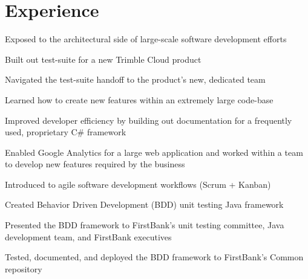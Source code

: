 \documentclass[]{darling-resume-openfont}
\begin{document}
\hfill
\begin{minipage}[t]{0.66\textwidth} 


\section{Experience}
\vspace{\topsep} %
\begin{tightemize}
\item Exposed to the architectural side of large-scale software development efforts
\item Built out test-suite for a new Trimble Cloud product
\item Navigated the test-suite handoff to the product's new, dedicated team
\end{tightemize}
\sectionsep

\begin{tightemize}
\item Learned how to create new features within an extremely large code-base
\item Improved developer efficiency by building out documentation for a frequently used, proprietary C\#{} framework
\item Enabled Google Analytics for a large web application and worked within a team to develop new features required by the business
\end{tightemize}
\sectionsep

\begin{tightemize}
\item Introduced to agile software development workflows (Scrum + Kanban)
\item Created Behavior Driven Development (BDD) unit testing Java framework
\item Presented the BDD framework to FirstBank's unit testing committee, Java development team, and FirstBank executives
\item Tested, documented, and deployed the BDD framework to FirstBank's Common repository
\end{tightemize}
\sectionsep


\end{minipage}
\end{document}
